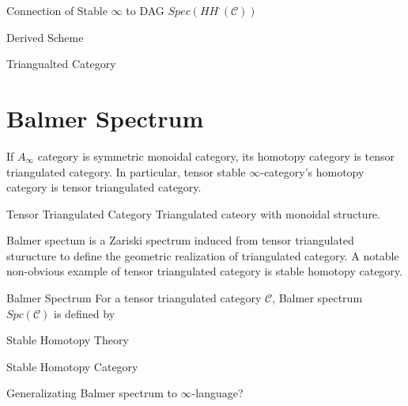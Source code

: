 \documentclass{article}
\begin{document}
\begin{proposition}{Connection of Stable $\infty$ to DAG}{}
$Spec (HH^\cdot (\mathcal{C}))$
\end{proposition}



\begin{definition} {Derived Scheme}{}

\end{definition}


\begin{definition} {Triangualted Category}{}
\end{definition}












\section{Balmer Spectrum}

If $A_\infty$ category is symmetric monoidal category, its homotopy category is tensor triangulated category.
In particular, tensor stable $\infty$-category's homotopy category is tensor triangulated category.

\begin{definition} {Tensor Triangulated Category}{}
Triangulated cateory with monoidal structure.
\end{definition}


Balmer spectum is a Zariski spectrum induced from tensor triangulated sturucture
to define the geometric realization of triangulated category.
A notable non-obvious example of tensor triangulated category is stable homotopy category.


\begin{definition} {Balmer Spectrum}{}
For a tensor triangulated category $\mathcal{C}$, Balmer spectrum $Spc(\mathcal{C})$ is defined by \\
\end{definition}


\begin{definition} {Stable Homotopy Theory}{}
\end{definition}


\begin{definition} {Stable Homotopy Category}{}
\end{definition}


Generalizating Balmer spectrum to $\infty$-language?
\end{document}
